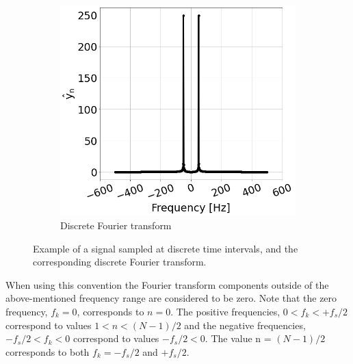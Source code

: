\begin{figure}[!ht]
\begin{subfigure}[t]{0.45\textwidth}
        \includegraphics[width=1\textwidth]{./images/app_B/simple_signal_1freq_fft_example.png}
        \caption{Discrete Fourier transform}
        \label{fig:signal_and_DFT_example_b}
    \end{subfigure}
    \hfill
     \caption{Example of a signal sampled at discrete time intervals, and the corresponding discrete Fourier transform.}
     \label{fig:signal_and_DFT_example}
\end{figure}

When using this convention the Fourier transform components outside of the above-mentioned frequency range are considered to be zero. Note that the zero frequency, $f_k=0$, corresponds to $n=0$. The positive frequencies, $0  < f_k < + f_s/2$ correspond to values $1 < n < (N-1)/2$ and the negative frequencies,  $-f_s/2  < f_k < 0$ correspond to values $-f_s/2 < 0$. The value n = $(N-1)/2$ corresponds to both $f_k = - f_s/2$ and $+f_s/2$.





